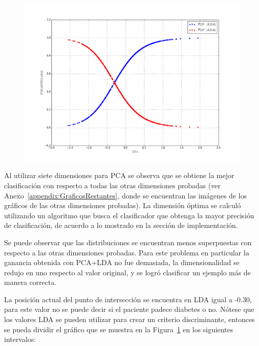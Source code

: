 \documentclass[letter, titlepage, 10pt]{article}
\begin{document}
\begin{figure}[H]
\begin{minipage}{.5\textwidth}
    \end{minipage}
    \begin{minipage}{.5\textwidth}
        \centering
        \includegraphics[width=1\linewidth]{images/CP_D7}
        \label{figure:ProbabilidadCondicional7D}
    \end{minipage}
\end{figure}
Al utilizar siete dimensiones para PCA se observa que se obtiene la mejor clasificación con respecto a todas las otras dimensiones probadas (ver Anexo~\ref{appendix:GraficosRestantes}, donde se encuentran las imágenes de los gráficos de las otras dimensiones probadas). La dimensión óptima se calculó utilizando un algoritmo que busca el clasificador que obtenga la mayor precisión de clasificación, de acuerdo a lo mostrado en la sección de implementación.

Se puede observar que las distribuciones se encuentran menos superpuestas con respecto a las otras dimensiones probadas.  Para este problema en particular la ganancia obtenida con PCA+LDA no fue demasiada, la dimensionalidad se redujo en uno respecto al valor original, y se logró clasificar un ejemplo más de manera correcta.

\newpage

La posición actual del punto de intersección se encuentra en LDA igual a -0.30, para este valor no se puede decir si el paciente padece diabetes o no. Nótese que los valores LDA se pueden utilizar para crear un criterio discriminante, entonces se pueda dividir el gráfico que se muestra en la Figura~\ref{figure:ProbabilidadCondicional7D} en los siguientes intervalos:
\end{document}
